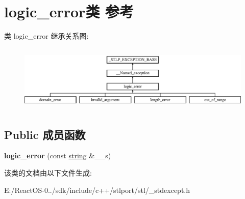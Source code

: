 \hypertarget{classlogic__error}{}\section{logic\+\_\+error类 参考}
\label{classlogic__error}
类 logic\+\_\+error 继承关系图\+:\begin{figure}[H]
\begin{center}
\leavevmode
\includegraphics[height=3.200000cm]{classlogic__error}
\end{center}
\end{figure}
\subsection*{Public 成员函数}
\begin{DoxyCompactItemize}
\item 
\mbox{\label{classlogic__error_a4f4b0af5efca1b8a8972eec4d91a6ac6}} 
{\bfseries logic\+\_\+error} (const \hyperlink{structstring}{string} \&\+\_\+\+\_\+s)
\end{DoxyCompactItemize}


该类的文档由以下文件生成\+:\begin{DoxyCompactItemize}
\item 
E\+:/\+React\+O\+S-\/0../sdk/include/c++/stlport/stl/\+\_\+stdexcept.\+h\end{DoxyCompactItemize}
